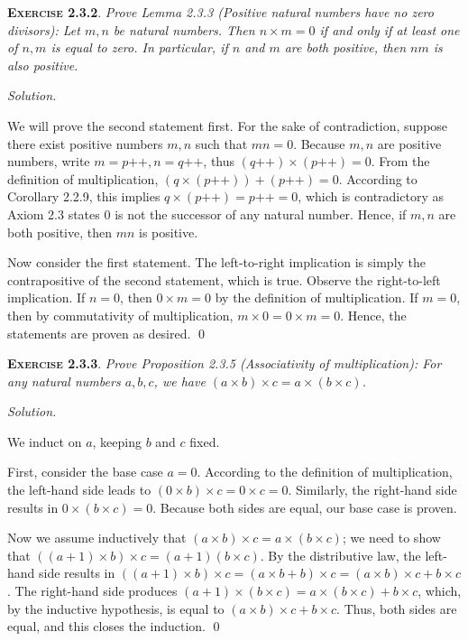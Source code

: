 \documentclass[12pt]{article}
\newcommand{\succr}[1]{#1 \textrm{++}}
\theoremstyle{remark}
\newenvironment{exer}[2]{
    \noindent \setlength{\parskip}{1em}%
    \textsc{\textbf{Exercise #1}}. \textit{#2} \par
    \noindent \textit{Solution.} %
}{\bigskip}
\begin{document}
\begin{exer}{2.3.2}{
    Prove Lemma 2.3.3 (Positive natural numbers have no zero divisors):
    Let $m, n$ be natural numbers.
    Then $n \times m = 0$ if and only if at least one of $n, m$ is equal to zero.
    In particular, if $n$ and $m$ are both positive, then $nm$ is also positive.
}
    We will prove the second statement first.
    For the sake of contradiction, suppose there exist positive numbers $m, n$ such that $mn = 0$.
    Because $m, n$ are positive numbers, write $m = \succr{p}, n = \succr{q}$, thus $(\succr{q}) \times (\succr{p})  = 0$.
    From the definition of multiplication, $(q \times (\succr{p})) + (\succr{p}) = 0$.
    According to Corollary 2.2.9, this implies $q \times (\succr{p}) = \succr{p} = 0$,
    which is contradictory as Axiom 2.3 states $0$ is not the successor of any natural number.
    Hence, if $m, n$ are both positive, then $mn$ is positive.

    Now consider the first statement.
    The left-to-right implication is simply the contrapositive of the second statement, which is true.
    Observe the right-to-left implication.
    If $n = 0$, then $0 \times m = 0$ by the definition of multiplication.
    If $m = 0$, then by commutativity of multiplication, $m \times 0 = 0 \times m = 0$.
    Hence, the statements are proven as desired. \qed
\end{exer}


\begin{exer}{2.3.3}{
    Prove Proposition 2.3.5 (Associativity of multiplication):
    For any natural numbers $a, b, c$, we have $(a \times b) \times c = a \times (b \times c)$.
}
    We induct on $a$, keeping $b$ and $c$ fixed.
    
    First, consider the base case $a = 0$.
    According to the definition of multiplication, the left-hand side leads to $(0 \times b) \times c = 0 \times c = 0$.
    Similarly, the right-hand side results in $0 \times (b \times c) = 0$.
    Because both sides are equal, our base case is proven.

    Now we assume inductively that $(a \times b) \times c = a \times (b \times c)$;
    we need to show that $((a+1) \times b) \times c = (a+1)(b \times c)$.
    By the distributive law, the left-hand side results in $((a + 1) \times b) \times c = (a \times b + b) \times c = (a \times b) \times c + b \times c$.
    The right-hand side produces $(a + 1) \times (b \times c) = a \times (b \times c) + b \times c$, which, by the inductive hypothesis, is equal to $(a \times b) \times c + b \times c$.
    Thus, both sides are equal, and this closes the induction. \qed
\end{exer}
\end{document}
